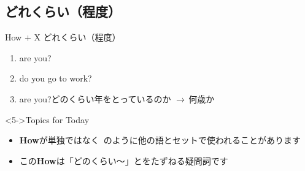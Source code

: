 \documentclass[aspectratio=169,xcolor={dvipsnames,table}]{beamer}
\begin{document}
\subsection{ どれくらい（程度）}
\begin{frame}[plain]{How $+$ X どれくらい（程度）}
 \begin{enumerate}
  \item<1->  are you?
  \item<2->  do you go to work?
  \item<3->  are you?\hfill{\scriptsize どのくらい年をとっているのか $\longrightarrow$\,何歳か}
 \end{enumerate}

\bigskip

\begin{block}<5->{Topics for Today}
 \begin{itemize}[square]\small
  \item {\bfseries How}が単独ではなく\,\,\,のように他の語とセットで使われることがあります
  \item この{\bfseries How}は「どのくらい～」とをたずねる疑問詞です
\end{itemize}
\end{block}
\end{frame}
\end{document}
